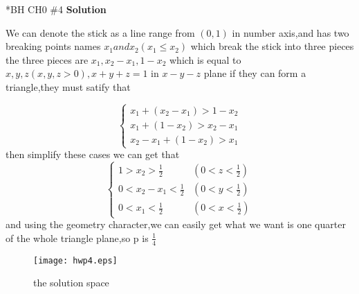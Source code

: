\documentclass{article}
\newcommand{\solution}{\textbf{\Large Solution}}
\begin{document}
\begin{homeworkProblem}*{BH CH0 \#4}
	\solution
	
	We can denote the stick as a line range from $(0,1)$ in number axis,and has two breaking points names $x_1 and x_2(x_1\leq x_2)$ which break the stick into three pieces
	the three pieces are $x_1,x_2-x_1,1-x_2$ which is equal to $x,y,z(x,y,z>0),x+y+z=1$ in $x-y-z$ plane if they can form a triangle,they must satify that

	$$
	\begin{cases}
	x_1+(x_2-x_1)>1-x_2\\
	x_1+(1-x_2)>x_2-x_1 \\
	x_2-x_1+(1-x_2)>x_1 

	\end{cases}
$$
then simplify these cases we can get that
$$
\begin{cases}
1>x_2>\frac{1}{2} &(0<z<\frac{1}{2})\\
0<x_2-x_1<\frac{1}{2} &(0<y<\frac{1}{2}) \\
0<x_1<\frac{1}{2} &(0<x<\frac{1}{2})

\end{cases}
$$
and using the geometry character,we can easily get what we want is one quarter of the whole triangle plane,so p is $\frac{1}{4}$
\begin{figure}[htbp]
	\centering
	\texttt{[image: hwp4.eps]}
	\caption{the solution space}
\end{figure}
\end{homeworkProblem}
\end{document}
